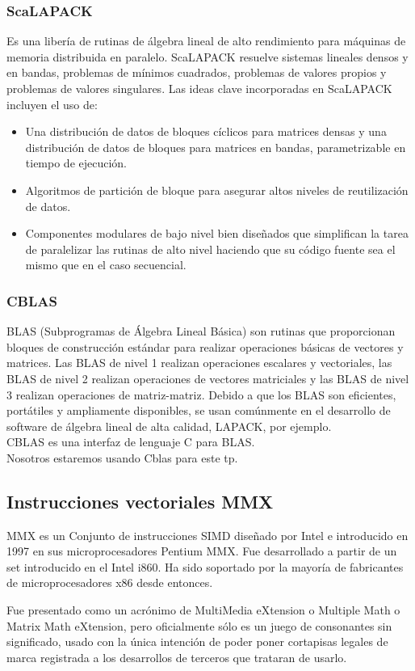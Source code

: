     \subsubsection{ScaLAPACK}
        Es una libería de rutinas de álgebra lineal de alto rendimiento para máquinas
        de memoria distribuida en paralelo. ScaLAPACK resuelve sistemas lineales
        densos y en bandas, problemas de mínimos cuadrados, problemas de valores
        propios y problemas de valores singulares. Las ideas clave incorporadas en
        ScaLAPACK incluyen el uso de:
        \begin{itemize}
            \item Una distribución de datos de bloques cíclicos para matrices densas
            y una distribución de datos de bloques para matrices en bandas,
            parametrizable en tiempo de ejecución.
            \item Algoritmos de partición de bloque para asegurar altos niveles de
            reutilización de datos.
            \item Componentes modulares de bajo nivel bien diseñados que simplifican
            la tarea de paralelizar las rutinas de alto nivel haciendo que su código
            fuente sea el mismo que en el caso secuencial.
        \end{itemize}

    \subsubsection{CBLAS}
        BLAS (Subprogramas de Álgebra Lineal Básica) son rutinas que proporcionan
        bloques de construcción estándar para realizar operaciones básicas de
        vectores y matrices. Las BLAS de nivel 1 realizan operaciones escalares
        y vectoriales, las BLAS de nivel 2 realizan operaciones de
        vectores matriciales y las BLAS de nivel 3 realizan operaciones
        de matriz-matriz. Debido a que los BLAS son eficientes, portátiles y
        ampliamente disponibles, se usan comúnmente en el desarrollo de software
        de álgebra lineal de alta calidad, LAPACK, por ejemplo.\\
        CBLAS es una interfaz de lenguaje C para BLAS.\\
        Nosotros estaremos usando Cblas para este tp.

\subsection{Instrucciones vectoriales MMX}
    MMX es un Conjunto de instrucciones SIMD diseñado por Intel e introducido en
    1997 en sus microprocesadores Pentium MMX. Fue desarrollado a partir de un
    set introducido en el Intel i860. Ha sido soportado por la mayoría de
    fabricantes de microprocesadores x86 desde entonces.

    Fue presentado como un acrónimo de MultiMedia eXtension o Multiple Math o
    Matrix Math eXtension, pero oficialmente sólo es un juego de consonantes
    sin significado, usado con la única intención de poder poner cortapisas
    legales de marca registrada a los desarrollos de terceros que trataran de
    usarlo.
